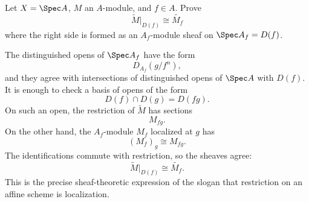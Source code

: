 \begin{problem}\label{prob:vi33-13}
Let \(X=\Spec A\), \(M\) an \(A\)-module, and \(f\in A\). Prove
\[
\widetilde M|_{D(f)}
\cong
\widetilde{M_f}
\]
where the right side is formed as an \(A_f\)-module sheaf on \(\Spec A_f=D(f)\).

\end{problem}

\ifdefined\FullProblemDossiers
\begin{solution}
The distinguished opens of \(\Spec A_f\) have the form
\[
D_{A_f}(g/f^n),
\]
and they agree with intersections of distinguished opens of \(\Spec A\) with \(D(f)\). It is enough to check a
basis of opens of the form
\[
D(f)\cap D(g)=D(fg).
\]
On such an open, the restriction of \(\widetilde M\) has sections
\[
M_{fg}.
\]
On the other hand, the \(A_f\)-module \(M_f\) localized at \(g\) has
\[
(M_f)_g\cong M_{fg}.
\]
The identifications commute with restriction, so the sheaves agree:
\[
\boxed{
\widetilde M|_{D(f)}
\cong
\widetilde{M_f}.
}
\]
This is the precise sheaf-theoretic expression of the slogan that restriction on an affine scheme is localization.
\end{solution}
\fi
